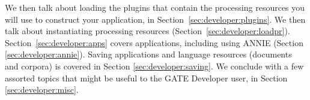We then talk about loading the plugins that contain the processing resources you
will use to construct your application, in Section~\ref{sec:developer:plugins}.
We then talk about instantiating processing resources
(Section~\ref{sec:developer:loadpr}). Section~\ref{sec:developer:apps} covers
applications, including using ANNIE (Section \ref{sec:developer:annie}). Saving
applications and language resources (documents and corpora) is covered in Section
\ref{sec:developer:saving}. We conclude with a few assorted topics that might be
useful to the GATE Developer user, in Section \ref{sec:developer:misc}.

%


